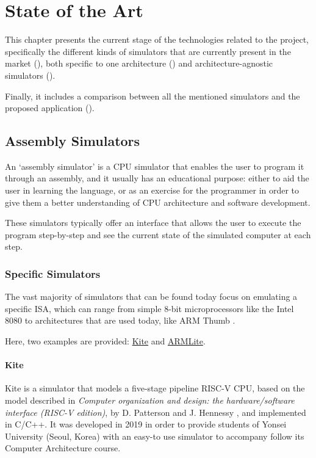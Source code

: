 \chapter{State of the Art}\label{chap:state-of-the-art}
This chapter presents the current stage of the technologies related to the project, specifically the different kinds of simulators that are currently present in the market (), both specific to one architecture () and architecture-agnostic simulators ().

\noindent
Finally, it includes a comparison between all the mentioned simulators and the proposed application ().



\section{Assembly Simulators}\label{sec:assembly-simulators}
An `\gls{assembly simulator}' is a CPU simulator that enables the user to program it through an \gls{assembly}, and it usually has an educational purpose: either to aid the user in learning the language, or as an exercise for the programmer in order to give them a better understanding of CPU architecture and software development.

These simulators typically offer an interface that allows the user to execute the program step-by-step and see the current state of the simulated \gls{computer} at each step.


\subsection{Specific Simulators}\label{subsec:specific-assembly-simulators}
The vast majority of simulators that can be found today focus on emulating a specific \gls{ISA}, which can range from simple 8-bit microprocessors like the Intel 8080 \parencite{i8080emulator} to architectures that are used today, like ARM Thumb \parencite{QtARMSim}.

\noindent
Here, two examples are provided: \hyperref[subsubsec:kite]{Kite} and \hyperref[subsubsec:armlite]{ARMLite}.


\subsubsection*{Kite}\label{subsubsec:kite}
Kite \parencite{song_kite2019} is a simulator that models a five-stage \gls{pipeline} RISC-V CPU, based on the model described in \textit{Computer organization and design: the hardware/software interface (RISC-V edition)}, by D. Patterson and J. Hennessy \parencite{PattersonDavidA.2018Coad}, and implemented in C/C++. It was developed in 2019 in order to provide students of Yonsei University (Seoul, Korea) with an easy-to use simulator to accompany follow its Computer Architecture course.

